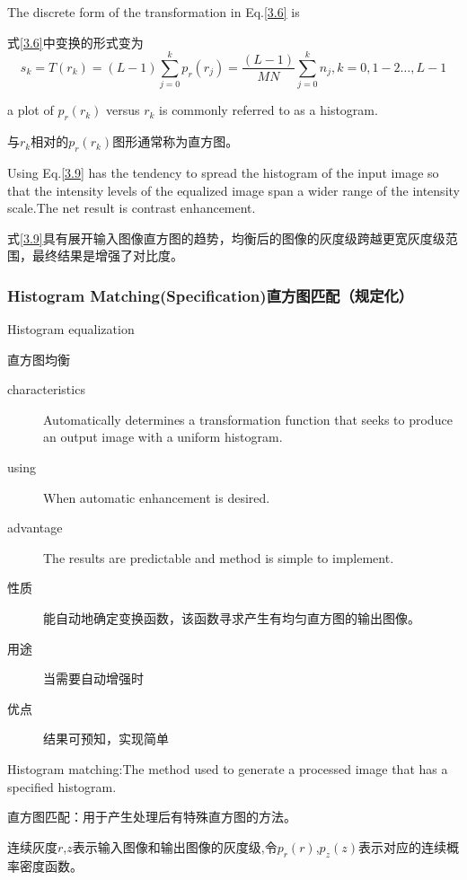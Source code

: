\documentclass[12pt]{article}
\numberwithin{equation}{section}%
\begin{document}
The discrete form of the transformation in Eq.\ref{3.6} is

式\ref{3.6}中变换的形式变为
\begin{equation} \label {3.9}
s_{k}=T(r_{k})=(L-1)\sum_{j=0}^{k}p_{r}(r_{j})=\frac{(L-1)}{MN}\sum_{j=0}^{k}{n_{j}},k=0,1-2\ldots,L-1
\end{equation}

a plot of $p_{r}(r_{k})$ versus $r_{k}$ is commonly referred to as a histogram.

与$r_{k}$相对的$p_{r}(r_{k})$图形通常称为直方图。

Using Eq.\ref{3.9} has the tendency to spread the histogram of the input image so that the intensity levels of the equalized image span a wider range of the intensity scale.The net result is contrast enhancement.

式\ref{3.9}具有展开输入图像直方图的趋势，均衡后的图像的灰度级跨越更宽灰度级范围，最终结果是增强了对比度。
\subsubsection{Histogram Matching(Specification)直方图匹配（规定化）}
Histogram equalization 

直方图均衡

\begin{description}
\item[characteristics]Automatically determines a transformation function that seeks to produce an output image with a uniform histogram.
\item[using]When automatic enhancement is desired.
\item[advantage]The results are predictable and method is simple to implement.
\end{description}

\begin{description}
\item[性质]能自动地确定变换函数，该函数寻求产生有均匀直方图的输出图像。
\item[用途]当需要自动增强时
\item[优点]结果可预知，实现简单
\end{description}

Histogram matching:The method used to generate a processed image that has a specified histogram.

直方图匹配：用于产生处理后有特殊直方图的方法。



连续灰度$r$,$z$表示输入图像和输出图像的灰度级,令$p_{r}(r)$,$p_{z}(z)$表示对应的连续概率密度函数。
\end{document}

